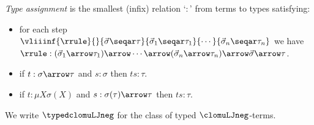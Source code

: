 \begin{definition}
    \emph{Type assignment} is the smallest (infix) relation `$:$' from terms to types satisfying:
    \begin{itemize}
        \item for each step $\vliiinf{\rrule}{}{\vec \sigma \seqar \tau}{\vec \sigma_1\seqar \tau_1}{\cdots}{\vec \sigma_n\seqar \tau_n}$ we have $\rrule : (\vec \sigma_1 \arrow \tau_1) \arrow \cdots \arrow (\vec \sigma_n \arrow \tau_n)\arrow \vec \sigma \arrow \tau$.
        \item if $t:\sigma\arrow \tau$ and $s:\sigma$ then $ts:\tau$.
        \item if $t:\mu X \sigma(X)$ and $s:\sigma(\tau)\arrow \tau$ then $ts:\tau$.
    \end{itemize}
  We write $\typedclomuLJneg$ for the class of typed $\clomuLJneg$-terms.
\end{definition}




